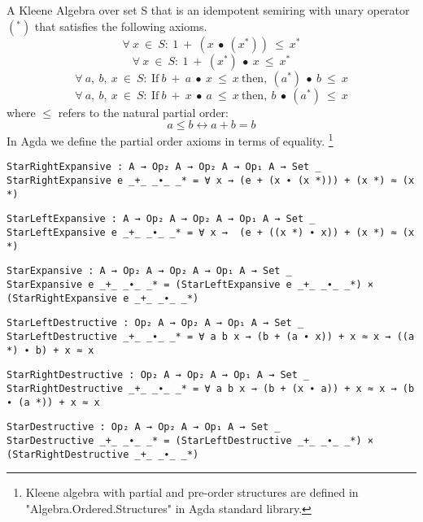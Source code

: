 A Kleene Algebra over set S that is an idempotent semiring with unary operator
$(^{*})$ that satisfies the following axioms.
\begin{equation}\label{eq_starrightexpansive}
\forall\ x\ \in\ S:\ 1\ +\ (x\ ∙\ (x^{*}))\ \leq\ x^{*}
\end{equation}
\begin{equation}\label{eq_starleftexpansive}
\forall\ x\ \in\ S:\ 1\ +\ (x^{*})\ ∙\ x\ \leq\ x^{*}
\end{equation}
\begin{equation}\label{eq_starleftdestructive}
\forall\ a,\ b,\ x\ \in\ S:\ \text{If} \ b\ +\ a\  ∙\ x\ \leq\ x\ \text{then},\ (a^{*})\ ∙\ b\ \leq\ x
\end{equation}
\begin{equation}\label{eq_starrightdestructive}
\forall\ a,\ b,\ x\ \in\ S:\ \text{If} \ b\ +\ x\ ∙\ a\ \leq\ x \  \text{then},\ b\ ∙\ (a^{*})\ \leq\ x
\end{equation}
where $\leq$ refers to the natural partial order: 
\[a \leq b \leftrightarrow a + b = b\] In Agda we define the partial order
axioms in terms of equality. \footnote{Kleene algebra with partial and pre-order
structures are defined in "Algebra.Ordered.Structures" in Agda standard
library.}

\begin{verbatim}
StarRightExpansive : A → Op₂ A → Op₂ A → Op₁ A → Set _
StarRightExpansive e _+_ _∙_ _* = ∀ x → (e + (x ∙ (x *))) + (x *) ≈ (x *)
\end{verbatim}
\begin{verbatim}
StarLeftExpansive : A → Op₂ A → Op₂ A → Op₁ A → Set _
StarLeftExpansive e _+_ _∙_ _* = ∀ x →  (e + ((x *) ∙ x)) + (x *) ≈ (x *)
\end{verbatim}
\begin{verbatim}
StarExpansive : A → Op₂ A → Op₂ A → Op₁ A → Set _
StarExpansive e _+_ _∙_ _* = (StarLeftExpansive e _+_ _∙_ _*) × (StarRightExpansive e _+_ _∙_ _*)
\end{verbatim}
\begin{verbatim}
StarLeftDestructive : Op₂ A → Op₂ A → Op₁ A → Set _
StarLeftDestructive _+_ _∙_ _* = ∀ a b x → (b + (a ∙ x)) + x ≈ x → ((a *) ∙ b) + x ≈ x
\end{verbatim}
\begin{verbatim}
StarRightDestructive : Op₂ A → Op₂ A → Op₁ A → Set _
StarRightDestructive _+_ _∙_ _* = ∀ a b x → (b + (x ∙ a)) + x ≈ x → (b ∙ (a *)) + x ≈ x
\end{verbatim}
\begin{verbatim}
StarDestructive : Op₂ A → Op₂ A → Op₁ A → Set _
StarDestructive _+_ _∙_ _* = (StarLeftDestructive _+_ _∙_ _*) × (StarRightDestructive _+_ _∙_ _*)
\end{verbatim}

